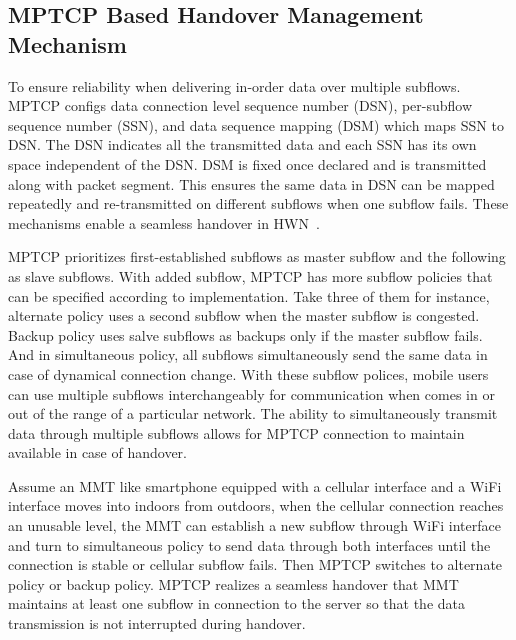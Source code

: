 \documentclass[conference]{IEEEtran}
\begin{document}
\subsection{MPTCP Based Handover Management Mechanism} 



To ensure reliability when delivering in-order data over multiple subflows. 
MPTCP configs 
 data connection level sequence number (DSN), per-subflow sequence number (SSN), and data sequence mapping (DSM) which maps SSN to DSN. 
The DSN indicates all the transmitted data and each SSN has its own space independent of the DSN. 
DSM is fixed once declared and is transmitted along with packet segment.
This ensures the same data in DSN can be mapped repeatedly and re-transmitted on different subflows when one subflow fails. 
These mechanisms enable a seamless handover in HWN~\cite{MPTCP}.


MPTCP prioritizes first-established subflows as master subflow and the following as slave subflows. 
With added subflow, MPTCP has more subflow policies that can be specified according to implementation. Take three of them for instance, 
alternate policy uses a second subflow when the master subflow is congested. 
Backup policy uses salve subflows as backups only if the master subflow fails. 
And in simultaneous policy, all subflows simultaneously send the same data in case of dynamical connection change. 
With these subflow polices, mobile users can use multiple subflows interchangeably for communication when comes in or out of the range of a particular network. 
The ability to simultaneously transmit data through multiple subflows allows for MPTCP connection to maintain available in case of handover.

Assume an MMT like smartphone equipped with a cellular interface and a WiFi interface moves into indoors from outdoors, when the cellular connection reaches an unusable level, the MMT can 
 establish a new subflow through WiFi interface and turn to simultaneous policy to send data through both interfaces until the connection is stable or cellular subflow fails. Then MPTCP switches to alternate policy or backup policy. 
MPTCP realizes a seamless handover that MMT maintains at least one subflow in connection to the server so that the data transmission is not interrupted during handover.
\end{document}
